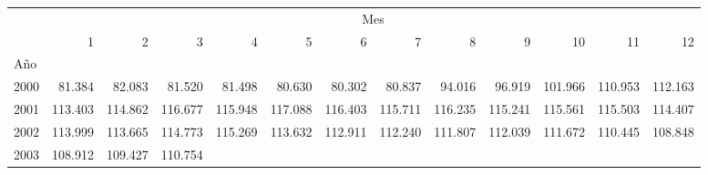 \begin{tabular}{lllllllllllll}
\cline{1-13}
\multicolumn{1}{c}{} &
  \multicolumn{12}{|c}{Mes} \\
\multicolumn{1}{c}{} &
  \multicolumn{1}{|r}{1} &
  \multicolumn{1}{r}{2} &
  \multicolumn{1}{r}{3} &
  \multicolumn{1}{r}{4} &
  \multicolumn{1}{r}{5} &
  \multicolumn{1}{r}{6} &
  \multicolumn{1}{r}{7} &
  \multicolumn{1}{r}{8} &
  \multicolumn{1}{r}{9} &
  \multicolumn{1}{r}{10} &
  \multicolumn{1}{r}{11} &
  \multicolumn{1}{r}{12} \\
\cline{1-13}
\multicolumn{1}{l}{Año} &
  \multicolumn{1}{|r}{} &
  \multicolumn{1}{r}{} &
  \multicolumn{1}{r}{} &
  \multicolumn{1}{r}{} &
  \multicolumn{1}{r}{} &
  \multicolumn{1}{r}{} &
  \multicolumn{1}{r}{} &
  \multicolumn{1}{r}{} &
  \multicolumn{1}{r}{} &
  \multicolumn{1}{r}{} &
  \multicolumn{1}{r}{} &
  \multicolumn{1}{r}{} \\
\multicolumn{1}{l}{\hspace{1em}2000} &
  \multicolumn{1}{|r}{81.384} &
  \multicolumn{1}{r}{82.083} &
  \multicolumn{1}{r}{81.520} &
  \multicolumn{1}{r}{81.498} &
  \multicolumn{1}{r}{80.630} &
  \multicolumn{1}{r}{80.302} &
  \multicolumn{1}{r}{80.837} &
  \multicolumn{1}{r}{94.016} &
  \multicolumn{1}{r}{96.919} &
  \multicolumn{1}{r}{101.966} &
  \multicolumn{1}{r}{110.953} &
  \multicolumn{1}{r}{112.163} \\
\multicolumn{1}{l}{\hspace{1em}2001} &
  \multicolumn{1}{|r}{113.403} &
  \multicolumn{1}{r}{114.862} &
  \multicolumn{1}{r}{116.677} &
  \multicolumn{1}{r}{115.948} &
  \multicolumn{1}{r}{117.088} &
  \multicolumn{1}{r}{116.403} &
  \multicolumn{1}{r}{115.711} &
  \multicolumn{1}{r}{116.235} &
  \multicolumn{1}{r}{115.241} &
  \multicolumn{1}{r}{115.561} &
  \multicolumn{1}{r}{115.503} &
  \multicolumn{1}{r}{114.407} \\
\multicolumn{1}{l}{\hspace{1em}2002} &
  \multicolumn{1}{|r}{113.999} &
  \multicolumn{1}{r}{113.665} &
  \multicolumn{1}{r}{114.773} &
  \multicolumn{1}{r}{115.269} &
  \multicolumn{1}{r}{113.632} &
  \multicolumn{1}{r}{112.911} &
  \multicolumn{1}{r}{112.240} &
  \multicolumn{1}{r}{111.807} &
  \multicolumn{1}{r}{112.039} &
  \multicolumn{1}{r}{111.672} &
  \multicolumn{1}{r}{110.445} &
  \multicolumn{1}{r}{108.848} \\
\multicolumn{1}{l}{\hspace{1em}2003} &
  \multicolumn{1}{|r}{108.912} &
  \multicolumn{1}{r}{109.427} &
  \multicolumn{1}{r}{110.754} &

\end{tabular}
